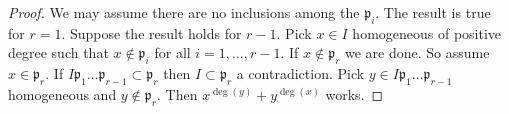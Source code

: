 \documentclass[10pt,a4paper]{amsart}
\theoremstyle{plain}
\theoremstyle{definition}
\theoremstyle{remark}
\numberwithin{equation}{subsection}
\begin{document}
\begin{proof}
We may assume there are no inclusions among the $\mathfrak p_i$.
The result is true for $r = 1$. Suppose the result holds for $r - 1$.
Pick $x \in I$ homogeneous of positive degree such that
$x \not \in \mathfrak p_i$ for all $i = 1, \ldots, r - 1$.
If $x \not\in \mathfrak p_r$ we are done. So assume $x \in \mathfrak p_r$.
If $I \mathfrak p_1 \ldots \mathfrak p_{r-1} \subset \mathfrak p_r$
then $I \subset \mathfrak p_r$ a contradiction.
Pick $y \in I\mathfrak p_1 \ldots \mathfrak p_{r-1}$ homogeneous
and $y \not \in \mathfrak p_r$. Then $x^{\deg(y)} + y^{\deg(x)}$ works.
\end{proof}
\end{document}
